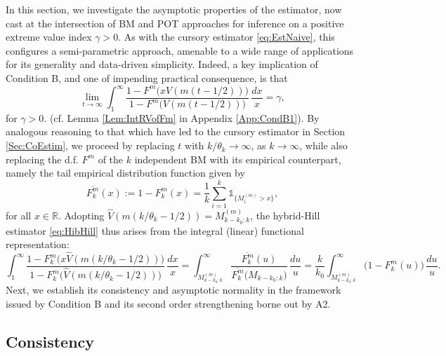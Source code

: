 \documentclass[11pt, a4paper, oneside]{article}
\numberwithin{equation}{section}
\theoremstyle{plain}
\theoremstyle{definition}
\newcommand{\field}[1]{\mathbb{#1}}
\newcommand{\real}{\ensuremath{{\field{R}}}}
\newcommand{\sumab}[2]{\ensuremath{\sum\limits_{#1}^{#2}}}
\newcommand{\one}{\mathds{1}}
\begin{document}
In this section, we investigate the asymptotic properties of the \citet{Hill1975} estimator, now cast at the intersection of BM and POT approaches for inference on a positive extreme value index $\gamma>0$. As with the cursory estimator \eqref{eq:EstNaive}, this  configures a semi-parametric approach,  amenable to a wide range of applications for its generality and data-driven simplicity.
Indeed, a key implication of Condition B, and one of impending practical consequence, is that
\begin{equation}
    \lim_{t\rightarrow \infty} \int_{1}^{\infty}\frac{1-F^m\bigl( x V(m(t-1/2)) \bigr) }{ 1 - F^m \bigl( V(m(t-1/2)) \bigr)}\, \frac{dx}{x} = \gamma,
\end{equation}
for $\gamma >0$. (cf. Lemma \ref{Lem:IntRVofFm} in Appendix \ref{App:CondB1}). By analogous reasoning to that which have led to the cursory estimator in Section \ref{Sec:CoEstim}, we proceed by replacing $t$ with $k/\theta_k \rightarrow \infty$, as $k \rightarrow \infty$, while also replacing the d.f. $F^m$ of the $k$ independent  BM with its empirical counterpart, namely the tail empirical distribution function given by
\begin{equation*}
    \overline{F_{k}^{m}}(x):= 1-F_{k}^{m}(x) = \frac{1}{k} \sumab{i=1}{k} \one_{\{M_{i}^{(m)} > x \}},
\end{equation*}
for all $x \in \real$. Adopting $\widehat{V}(m(k/\theta_k-1/2))=M^{(m)}_{k-k_0:k}$,  the hybrid-Hill estimator \eqref{eq:HibHill} thus arises from the integral (linear) functional representation:
\begin{equation*}
    \int_1^{\infty} \frac{1-F_{k}^{m}\bigl( x \widehat{V}(m(k/\theta_k-1/2)) \bigr) }{ 1-F_{k}^{m}\bigl( \widehat{V}(m(k/\theta_k-1/2)) \bigr)}\, \frac{dx}{x} = \int_{M^{(m)}_{k-k_0:k}}^{\infty} \frac{ \overline{F_{k}^{m}}(u)}{ \overline{F_{k}^{m}}\bigl(M_{k-k_0:k}\bigl) } \, \frac{du}{u} = \frac{k}{k_0} \int_{M^{(m)}_{k-k_0:k}}^{\infty} \bigl( 1-F_{k}^{m}(u)\bigr) \, \frac{du}{u}. 
\end{equation*}
Next, we establish its consistency and asymptotic normality in the framework issued by  Condition B and its second order strengthening borne out by A2.

\subsection{Consistency}
\end{document}
